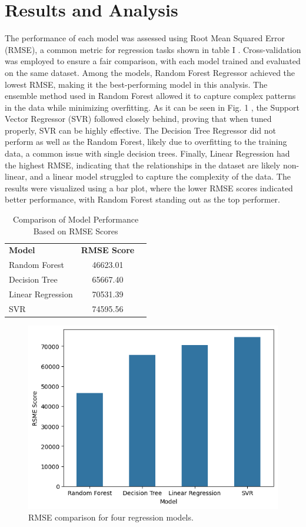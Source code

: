 \documentclass[conference]{IEEEtran}
\begin{document}
\section{Results and Analysis}
The performance of each model was assessed using Root Mean Squared Error (RMSE), a common metric for regression tasks shown in table I \cite{b1}. Cross-validation was employed to ensure a fair comparison, with each model trained and evaluated on the same dataset. Among the models, Random Forest Regressor achieved the lowest RMSE, making it the best-performing model in this analysis. The ensemble method used in Random Forest allowed it to capture complex patterns in the data while minimizing overfitting. As it can be seen in Fig. 1 \cite{b1}, the Support Vector Regressor (SVR) followed closely behind, proving that when tuned properly, SVR can be highly effective. The Decision Tree Regressor did not perform as well as the Random Forest, likely due to overfitting to the training data, a common issue with single decision trees. Finally, Linear Regression had the highest RMSE, indicating that the relationships in the dataset are likely non-linear, and a linear model struggled to capture the complexity of the data. The results were visualized using a bar plot, where the lower RMSE scores indicated better performance, with Random Forest standing out as the top performer.

\begin{table}[!t]
\centering
\caption{Comparison of Model Performance Based on RMSE Scores}
\begin{tabular}{lcc}

\textbf{Model}            & \textbf{RMSE Score}  \\

Random Forest             & 46623.01   \\
Decision Tree             & 65667.40   \\
Linear Regression         & 70531.39   \\
SVR                       & 74595.56   \\

\end{tabular}
\end{table}

\begin{figure}[!b] 
\centering    
\includegraphics[width=0.8\columnwidth] {output.png}     \caption{RMSE comparison for four regression models.}    \label{fig:example} \end{figure}
\end{document}
